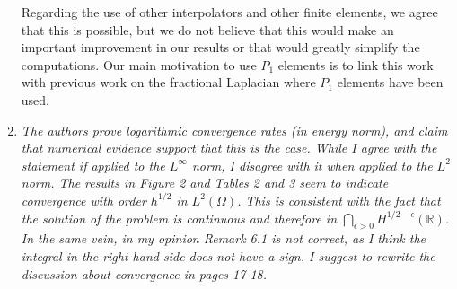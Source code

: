 \documentclass[11 pt]{article}
\numberwithin{equation}{section}
\def\r{\mathbb{R}}
\def\eps{\varepsilon}
\begin{document}
\begin{enumerate}
    Regarding the use of other interpolators and other finite elements, we agree that this is possible, but we do not believe that this would make an important improvement in our results or that would greatly simplify the computations. Our main motivation to use $P_1$ elements is to link this work with previous work on the fractional Laplacian where $P_1$ elements have been used.


    \item \emph{The authors prove logarithmic convergence rates (in energy norm), and claim that numerical evidence support that this is the case. While I agree with the statement if applied to the \(L^{\infty}\) norm, I disagree with it when applied to the \(L^{2}\) norm. The results in Figure 2 and Tables 2 and 3 seem to indicate convergence with order \(h^{1/2}\) in \(L^{2}(\Omega)\). This is consistent with the fact that the solution of the problem is continuous and therefore in \(\bigcap_{\epsilon>0}H^{1/2-\epsilon}(\mathbb{R})\). In the same vein, in my opinion Remark 6.1 is not correct, as I think the integral in the right-hand side does not have a sign. I suggest to rewrite the discussion about convergence in pages 17-18.}

%
%


\end{enumerate}
\end{document}
